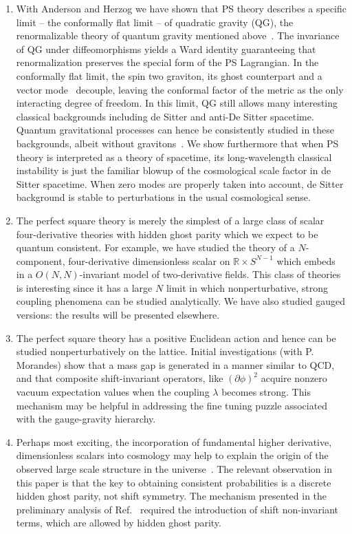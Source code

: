 \documentclass[pra,aps,amsmath,amssymb,notitlepage, twocolumn,superscriptaddress,longbibliography,nofootinbib,floatfix,10pt]{revtex4-2}
\begin{document}
\begin{enumerate}
\item With Anderson and Herzog we have shown that PS theory describes a specific limit -- the conformally flat limit -- of quadratic gravity (QG), the renormalizable theory of quantum gravity mentioned above~\cite{ABHTshort}. The invariance of QG under diffeomorphisms yields a Ward identity guaranteeing that renormalization preserves the special form of the PS Lagrangian. 
In the conformally flat limit, the spin two graviton, its ghost counterpart and a vector mode~\cite{Riegert:1984zz} decouple, leaving the conformal factor of the metric as the only interacting degree of freedom. In this limit, QG still allows many interesting classical backgrounds including de Sitter and anti-De Sitter spacetime. Quantum gravitational processes can hence be consistently studied in these backgrounds, albeit without gravitons~\cite{ABHTshort}. We show furthermore that when PS theory is interpreted as a theory of spacetime, its long-wavelength classical instability is just the familiar blowup of the cosmological scale factor in de Sitter spacetime. When zero modes are properly taken into account, de Sitter background is stable to perturbations in the usual cosmological sense. %


\item The perfect square theory is merely the simplest of a large class of scalar four-derivative theories with hidden ghost parity which we expect to be quantum consistent. For example, we have studied the theory of a $N$-component, four-derivative dimensionless scalar on $\mathbb{R}\times S^{N-1}$ which embeds in a $O(N,N)$-invariant model of two-derivative fields. This class of theories is interesting since it has a large $N$ limit in which nonperturbative, strong coupling phenomena can be studied analytically. We have also studied gauged versions: the results will be presented elsewhere. 
\item The perfect square theory has a positive Euclidean action and hence can be studied nonperturbatively on the lattice. Initial investigations (with P. Morandes)  show that a mass gap is generated in a manner similar to QCD, and that composite shift-invariant operators, like $(\partial \phi)^2$ acquire nonzero vacuum expectation values when the coupling $\lambda$ becomes strong.
This mechanism may be helpful in addressing the fine tuning puzzle associated with the gauge-gravity hierarchy. 
\item Perhaps most exciting, the incorporation of fundamental higher derivative, dimensionless scalars into cosmology may help to explain the origin of the observed large scale structure in the universe~\cite{Turok:2023amx}. The relevant observation in this paper is that the key to obtaining consistent probabilities is a discrete hidden ghost parity, not shift symmetry. The mechanism  presented in the preliminary analysis of Ref.~\cite{Turok:2023amx} required the introduction of shift non-invariant terms, which are allowed by hidden ghost parity.  

\end{enumerate}
\end{document}
